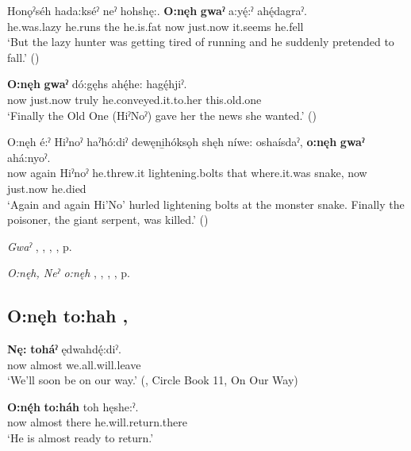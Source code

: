 \ea
\label{ex:opart37}
\gll Honǫˀséh hada:kséˀ neˀ hohshę:. \textbf{O:nęh} \textbf{gwaˀ} a:yę́:ˀ ahę́dagraˀ.\\
he.was.lazy he.runs the he.is.fat now just.now it.seems he.fell\\
\glt ‘But the lazy hunter was getting tired of running and he suddenly pretended to fall.’ (\cite{carrier_legends_2013})
\z

\ea
\label{ex:opart38}
\gll \textbf{O:nęh} \textbf{gwaˀ} dó:gęhs ahę́he: hagę́hjiˀ.\\
now just.now truly he.conveyed.it.to.her this.old.one\\
\glt ‘Finally the Old One (HiˀNoˀ) gave her the news she wanted.’ (\cite{carrier_legends_2013})
\z

\ea
\label{ex:opart39}
\gll O:nęh é:ˀ Hiˀnoˀ haˀhó:diˀ dewęni̱hóksǫh shęh níwe: oshaísdaˀ, \textbf{o:nęh} \textbf{gwaˀ} ahá:nyoˀ.\\
now again Hiˀnoˀ he.threw.it lightening.bolts that where.it.was snake, now just.now he.died\\
\glt ‘Again and again Hi’No’ hurled lightening bolts at the monster snake. Finally the poisoner, the giant serpent, was killed.’ (\cite{carrier_legends_2013})
\z

\begin{CayugaRelated}
\item \textit{Gwaˀ} , , , , p. \pageref{p:[gwaˀ] ‘immediately’}\\
\item \textit{O:nęh, Neˀ o:nęh} , , , , p. \pageref{p:[o:nęh]}
\end{CayugaRelated}


\subsection*{\textbf{O:nęh to:hah} , } \label{p:o:nęh to:hah]}

\ea
\label{ex:opart40}
\gll \textbf{Nę:} \textbf{toháˀ} ędwahdę́:diˀ.\\
now almost we.all.will.leave\\
\glt ‘We’ll soon be on our way.’ (\cite{keye_circle_2016}, Circle Book 11, On Our Way)
\z

\ea
\label{ex:opart41}
\gll \textbf{O:nę́h} \textbf{to:háh} toh hęshe:ˀ.\\
now almost there he.will.return.there\\
\glt ‘He is almost ready to return.’
\z

